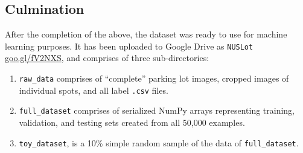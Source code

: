\documentclass[a4paper, 11pt]{article} %
\begin{document}
	\subsection{Culmination}
		After the completion of the above, the dataset was ready to use for machine learning purposes. It
		has been uploaded to Google Drive as \texttt{NUSLot}
		\hyperlink{https://goo.gl/fV2NXS}{goo.gl/fV2NXS}, and comprises of 
		three sub-directories:
		\begin{enumerate}
			\item \texttt{raw\_data} comprises of ``complete'' parking lot images, cropped images of
			individual spots, and all label \texttt{.csv} files.
			\item \texttt{full\_dataset} comprises of serialized NumPy arrays 
			representing
			training, validation, and testing sets created from all 50,000 examples. 
			\item \texttt{toy\_dataset}, is a 10\% simple random sample of the 
			data of
			\texttt{full\_dataset}.
		\end{enumerate}
\end{document}
